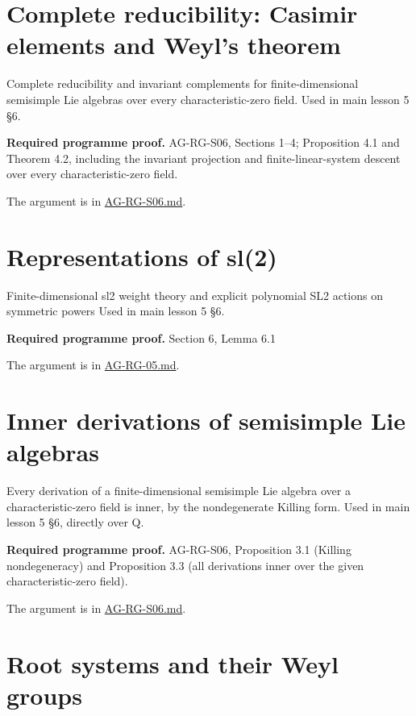 \documentclass[11pt,a4paper,openany]{report}
\begin{document}
\section{Complete reducibility: Casimir elements and Weyl's theorem}\label{complete-reducibility-casimir-elements-and-weyls-theorem}

Complete reducibility and invariant complements for finite-dimensional semisimple Lie algebras over every characteristic-zero field. Used in main lesson 5 §6.

\textbf{Required programme proof.} AG-RG-S06, Sections 1--4; Proposition 4.1 and Theorem 4.2, including the invariant projection and finite-linear-system descent over every characteristic-zero field.

The argument is in \href{https://github.com/KokunoYumeto/open-math-courses/blob/main/docs/courses/AG-RG/AG-RG-S06.md}{AG-RG-S06.md}.

\section{Representations of sl(2)}\label{representations-of-sl2}

Finite-dimensional sl2 weight theory and explicit polynomial SL2 actions on symmetric powers Used in main lesson 5 §6.

\textbf{Required programme proof.} Section 6, Lemma 6.1

The argument is in \href{https://github.com/KokunoYumeto/open-math-courses/blob/main/docs/courses/AG-RG/AG-RG-05.md}{AG-RG-05.md}.

\section{Inner derivations of semisimple Lie algebras}\label{inner-derivations-of-semisimple-lie-algebras}

Every derivation of a finite-dimensional semisimple Lie algebra over a characteristic-zero field is inner, by the nondegenerate Killing form. Used in main lesson 5 §6, directly over Q.

\textbf{Required programme proof.} AG-RG-S06, Proposition 3.1 (Killing nondegeneracy) and Proposition 3.3 (all derivations inner over the given characteristic-zero field).

The argument is in \href{https://github.com/KokunoYumeto/open-math-courses/blob/main/docs/courses/AG-RG/AG-RG-S06.md}{AG-RG-S06.md}.

\section{Root systems and their Weyl groups}\label{root-systems-and-their-weyl-groups}
\end{document}
